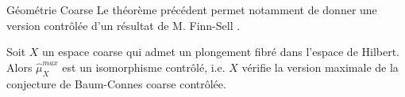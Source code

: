 \begin{frame}{Géométrie Coarse}
Le théorème précédent permet notamment de donner une version contrôlée d'un résultat de M. Finn-Sell \cite{FinnSellFibred}. \\
\vspace{0.3 cm}
\begin{corfr}
Soit $X$ un espace coarse qui admet un plongement fibré dans l'espace de Hilbert. Alors $\hat \mu_{X}^{max}$ est un isomorphisme contrôlé, i.e. $X$ vérifie la version maximale de la conjecture de Baum-Connes coarse contrôlée.\\
\end{corfr}
\end{frame}






